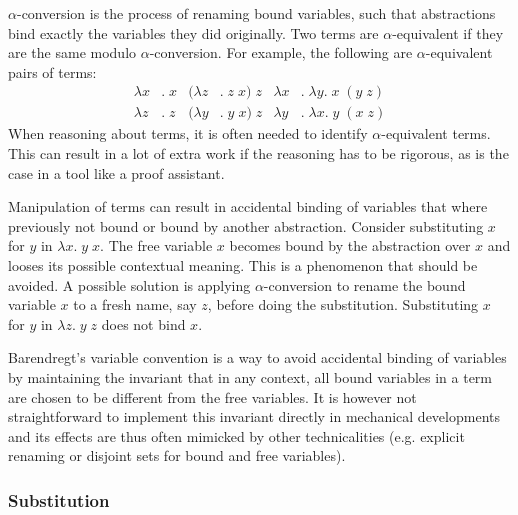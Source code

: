 \documentclass[a4paper,11pt]{article}
\begin{document}
$\alpha$-conversion is the process of renaming bound variables, such
that abstractions bind exactly the variables they did originally.
Two terms are $\alpha$-equivalent if they are the same modulo
$\alpha$-conversion.
For example, the following are $\alpha$-equivalent pairs of terms:
\begin{align*}
  \lambda x&. \; x & (\lambda z&. \; z \; x) \; z & \lambda x&. \; \lambda y. \; x \; (y \; z)\\
  \lambda z&. \; z & (\lambda y&. \; y \; x) \; z & \lambda y&. \; \lambda x. \; y \; (x \; z)
\end{align*}
When reasoning about terms, it is often needed to identify $\alpha$-equivalent
terms.
This can result in a lot of extra work if the reasoning has to be rigorous,
as is the case in a tool like a proof assistant.

Manipulation of terms can result in accidental binding of variables that
where previously not bound or bound by another abstraction.
Consider substituting $x$ for $y$ in $\lambda x. \; y \; x$.
The free variable $x$ becomes bound by the abstraction over $x$ and looses
its possible contextual meaning.
This is a phenomenon that should be avoided.
A possible solution is applying $\alpha$-conversion to rename the bound
variable $x$ to a fresh name, say $z$, before doing the substitution.
Substituting $x$ for $y$ in $\lambda z. \; y \; z$ does not bind $x$.

Barendregt's variable convention is a way to avoid accidental binding of
variables by maintaining the invariant that in any context, all bound
variables in a term are chosen to be different from the free variables.
It is however not straightforward to implement this invariant directly in
mechanical developments and its effects are thus often mimicked by other
technicalities (e.g. explicit renaming or disjoint sets for bound and
free variables).

\subsubsection*{Substitution}
\end{document}

